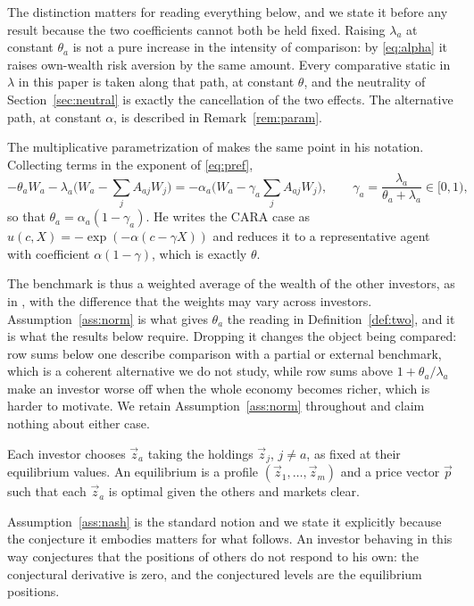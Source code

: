 The distinction matters for reading everything below, and we state it before
any result because the two coefficients cannot both be held fixed. Raising
$\lambda_a$ at constant $\theta_a$ is not a pure increase in the intensity of
comparison: by \eqref{eq:alpha} it raises own-wealth risk aversion by the same
amount. Every comparative static in $\lambda$ in this paper is taken along that
path, at constant $\theta$, and the neutrality of Section~\ref{sec:neutral} is
exactly the cancellation of the two effects. The alternative path, at constant
$\alpha$, is described in Remark~\ref{rem:param}.

The multiplicative parametrization of \cite{gomez} makes the same point in his
notation. Collecting terms in the exponent of \eqref{eq:pref},
%
\begin{equation}
-\theta_aW_a-\lambda_a\Big(W_a-\sum_jA_{aj}W_j\Big)
=-\alpha_a\Big(W_a-\gamma_a\sum_jA_{aj}W_j\Big),
\qquad \gamma_a=\frac{\lambda_a}{\theta_a+\lambda_a}\in[0,1),
\label{eq:param}
\end{equation}
%
so that $\theta_a=\alpha_a(1-\gamma_a)$. He writes the CARA case as
$u(c,X)=-\exp(-\alpha(c-\gamma X))$ and reduces it to a representative agent
with coefficient $\alpha(1-\gamma)$, which is exactly $\theta$.

The benchmark is thus a weighted average of the wealth of the other investors,
as in \cite{gomez}, with the difference that the weights may vary across
investors. Assumption~\ref{ass:norm} is what gives $\theta_a$ the reading in
Definition~\ref{def:two}, and it is what the results below require. Dropping it changes the object
being compared: row sums below one describe comparison with a partial or
external benchmark, which is a coherent alternative we do not study, while row
sums above $1+\theta_a/\lambda_a$ make an investor worse off when the whole
economy becomes richer, which is harder to motivate. We retain
Assumption~\ref{ass:norm} throughout and claim nothing about either case.

\begin{assumption}
\label{ass:nash}
Each investor chooses $\vec z_a$ taking the holdings $\vec z_j$, $j\neq a$,
as fixed at their equilibrium values. An equilibrium is a profile
$(\vec z_1,\dots,\vec z_m)$ and a price vector $\vec p$ such that each
$\vec z_a$ is optimal given the others and markets clear.
\end{assumption}

Assumption~\ref{ass:nash} is the standard notion and we state it explicitly
because the conjecture it embodies matters for what follows. An investor
behaving in this way conjectures that the positions of others do not respond to
his own: the conjectural derivative is zero, and the conjectured levels are the
equilibrium positions.

